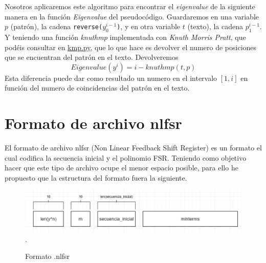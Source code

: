 Nosotros aplicaremos este algoritmo para encontrar el \textit{eigenvalue} de la siguiente manera en la función \textit{Eigenvalue} del pseudocódigo. Guardaremos en una variable $p$ (patrón), la cadena \texttt{reverse($y_0^{i-1}$)}, y en otra variable $t$ (texto), la cadena $p_1^{i-1}$. Y teniendo una función \textit{knuthmp} implementada con \textit{Knuth Morris Pratt}, que podéis consultar en \href{https://github.com/domingoUnican/TFGPedroCastro/blob/main/code/minimal_fsr/knuthMorrisPratt.py}{kmp.py}, que lo que hace es devolver el numero de posiciones que se encuentran del patrón en el texto. Devolveremos
\[Eigenvalue(y^i) = i - knuthmp(t, p)\]
Esta diferencia puede dar como resultado un numero en el intervalo $[1, i]$ en función del numero de coincidencias del patrón en el texto.


\section{Formato de archivo nlfsr}
\label{formato archivo nlfsr}
El formato de archivo nlfsr (Non Linear Feedback Shift Register) es un formato el cual codifica la secuencia inicial y el polinomio FSR. Teniendo como objetivo hacer que este tipo de archivo ocupe el menor espacio posible, para ello he propuesto que la estructura del formato fuera la siguiente.
\\
\begin{figure}[h] 
    \centering
    \includegraphics[width=\textwidth,keepaspectratio]{img/nlfsrformat_01.png} .
    \parbox{\linewidth}{\centering Formato .nlfsr}
    \label{fig:mi_imagen}
\end{figure}

